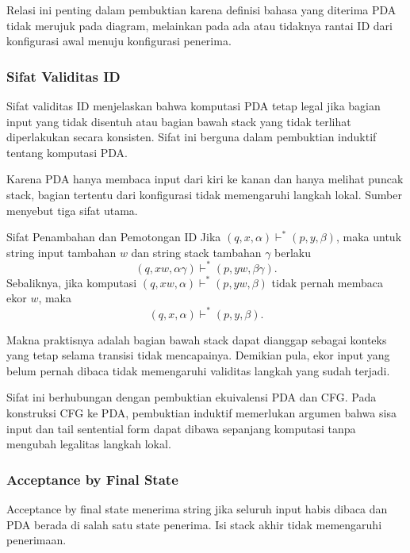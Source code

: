 Relasi ini penting dalam pembuktian karena definisi bahasa yang diterima PDA tidak merujuk pada diagram, melainkan pada ada atau tidaknya rantai ID dari konfigurasi awal menuju konfigurasi penerima.

\subsubsection{Sifat Validitas ID}

\begin{jawab}
Sifat validitas ID menjelaskan bahwa komputasi PDA tetap legal jika bagian input yang tidak disentuh atau bagian bawah stack yang tidak terlihat diperlakukan secara konsisten. Sifat ini berguna dalam pembuktian induktif tentang komputasi PDA.
\end{jawab}

Karena PDA hanya membaca input dari kiri ke kanan dan hanya melihat puncak stack, bagian tertentu dari konfigurasi tidak memengaruhi langkah lokal. Sumber menyebut tiga sifat utama.

\begin{thm}{Sifat Penambahan dan Pemotongan ID}{}
Jika $(q,x,\alpha)\vdash^*(p,y,\beta)$, maka untuk string input tambahan $w$ dan string stack tambahan $\gamma$ berlaku
\[
    (q,xw,\alpha\gamma)\vdash^*(p,yw,\beta\gamma).
\]
Sebaliknya, jika komputasi $(q,xw,\alpha)\vdash^*(p,yw,\beta)$ tidak pernah membaca ekor $w$, maka
\[
    (q,x,\alpha)\vdash^*(p,y,\beta).
\]
\end{thm}

Makna praktisnya adalah bagian bawah stack dapat dianggap sebagai konteks yang tetap selama transisi tidak mencapainya. Demikian pula, ekor input yang belum pernah dibaca tidak memengaruhi validitas langkah yang sudah terjadi.

Sifat ini berhubungan dengan pembuktian ekuivalensi PDA dan CFG. Pada konstruksi CFG ke PDA, pembuktian induktif memerlukan argumen bahwa sisa input dan tail sentential form dapat dibawa sepanjang komputasi tanpa mengubah legalitas langkah lokal.

\subsubsection{Acceptance by Final State}

\begin{jawab}
Acceptance by final state menerima string jika seluruh input habis dibaca dan PDA berada di salah satu state penerima. Isi stack akhir tidak memengaruhi penerimaan.
\end{jawab}

